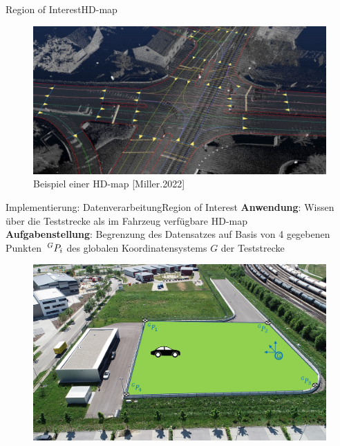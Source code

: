 \documentclass[169, handout	]{THIbeamer} %
\begin{document}
	\begin{frame}{Region of Interest}{HD-map}
		\begin{figure}
			\includegraphics[scale=0.3]{required/HD-Map.jpg}
			\caption{Beispiel einer HD-map [Miller.2022]}			
		\end{figure}
	\end{frame}
	\begin{frame}{Implementierung: Datenverarbeitung}{Region of Interest}							\textbf{Anwendung}: Wissen über die Teststrecke als im Fahrzeug verfügbare HD-map \\		
		\textbf{Aufgabenstellung}: Begrenzung des Datensatzes auf Basis von 4 gegebenen Punkten $\hspace*{0.2em}^G\vspace*{-0.2em}P_{i}$ des globalen Koordinatensystems $G$ der Teststrecke
		\begin{figure}
			\includegraphics[scale=0.4]{required/ROI-Teststrecke.jpg}
		\end{figure}
	\end{frame}
\end{document}
